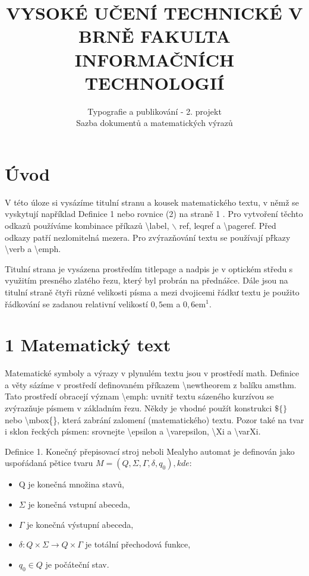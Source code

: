 \documentclass[10pt]{article}
\title{VYSOKÉ UČENÍ TECHNICKÉ V BRNĚ FAKULTA INFORMAČNÍCH TECHNOLOGIÍ }
\author{Typografie a publikování - 2. projekt\\
Sazba dokumentů a matematických výrazů}
\date{}
\begin{document}
\maketitle


\section*{Úvod}
V této úloze si vysázíme titulní stranu a kousek matematického textu, v němž se vyskytují například Definice 1 nebo rovnice (2) na straně 1 . Pro vytvoření těchto odkazů používáme kombinace příkazů \textbackslash label, $\backslash$ ref, leqref a \textbackslash pageref. Před odkazy patří nezlomitelná mezera. Pro zvýrazňování textu se používají př́kazy \textbackslash verb a \textbackslash emph.

Titulní strana je vysázena prostředím titlepage a nadpis je v optickém středu s využitím presného zlatého řezu, který byl probrán na přednášce. Dále jsou na titulní straně čtyři různé velikosti písma a mezi dvojicemi řádkư textu je použito řádkování se zadanou relativní velikostí $0,5 \mathrm{em}$ a $0,6 \mathrm{em}^{1}$.

\section*{1 Matematický text}
Matematické symboly a výrazy v plynulém textu jsou v prostředí math. Definice a věty sázíme $\mathrm{v}$ prostředí definovaném příkazem \textbackslash newtheorem z balíku amsthm. Tato prostředí obracejí význam \textbackslash emph: uvnitř textu sázeného kurzívou se zvýrazňuje písmem v základním řezu. Někdy je vhodné použít konstrukci $\$\{\}$ nebo \textbackslash mbox\{\}, která zabrání zalomení (matematického) textu. Pozor také na tvar i sklon řeckých písmen: srovnejte \textbackslash epsilon a \textbackslash varepsilon, \textbackslash Xi a \textbackslash varXi.

Definice 1. Konečný přepisovací stroj neboli Mealyho automat je definován jako uspoŕádaná pětice tvaru $M=\left(Q, \Sigma, \Gamma, \delta, q_{0}\right), k d e:$

\begin{itemize}
  \item Q je konečná množina stavů,
  \item $\Sigma$ je konečná vstupní abeceda,
  \item $\Gamma$ je konečná výstupní abeceda,
  \item $\delta: Q \times \Sigma \rightarrow Q \times \Gamma$ je totální přechodová funkce,
  \item $q_{0} \in Q$ je počáteční stav.
\end{itemize}
\end{document}
